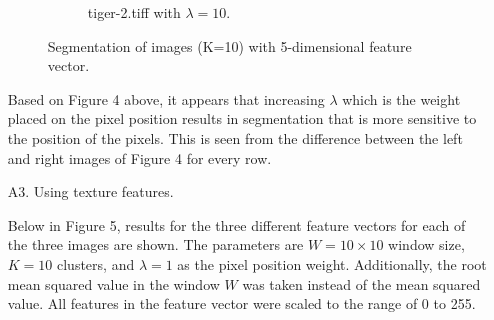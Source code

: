 \documentclass[12pt]{report}
\begin{document}
\begin{enumerate}
\begin{figure}[H]
\begin{subfigure}{0.48\linewidth}
      \caption{tiger-2.tiff with \( \lambda=10\).}
    \end{subfigure}
    \caption{Segmentation of images (K=10) with 5-dimensional feature vector.}
  \end{figure}

  Based on Figure 4 above, it appears that increasing \( \lambda\) which is the
  weight placed on the pixel position results in segmentation that is more
  sensitive to the position of the pixels. This is seen from the difference
  between the left and right images of Figure 4 for every row.

  \newpage
\item[A3.] Using texture features.

  Below in Figure 5, results for the three different feature vectors for each of
  the three images are shown. The parameters are \( W=10\times 10\) window size,
  \( K=10\) clusters, and \( \lambda=1\) as the pixel position
  weight. Additionally, the root mean squared value in the window \( W\) was
  taken instead of the mean squared value. All features in the feature vector
  were scaled to the range of 0 to 255.


\end{enumerate}
\end{document}
